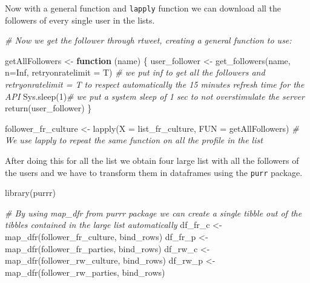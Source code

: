 \documentclass[
]{article}
\newenvironment{Shaded}{\begin{snugshade}}{\end{snugshade}}
\newcommand{\AttributeTok}[1]{\textcolor[rgb]{0.77,0.63,0.00}{#1}}
\newcommand{\CommentTok}[1]{\textcolor[rgb]{0.56,0.35,0.01}{\textit{#1}}}
\newcommand{\ConstantTok}[1]{\textcolor[rgb]{0.00,0.00,0.00}{#1}}
\newcommand{\ControlFlowTok}[1]{\textcolor[rgb]{0.13,0.29,0.53}{\textbf{#1}}}
\newcommand{\DecValTok}[1]{\textcolor[rgb]{0.00,0.00,0.81}{#1}}
\newcommand{\FunctionTok}[1]{\textcolor[rgb]{0.00,0.00,0.00}{#1}}
\newcommand{\NormalTok}[1]{#1}
\newcommand{\OtherTok}[1]{\textcolor[rgb]{0.56,0.35,0.01}{#1}}
\begin{document}
Now with a general function and \texttt{lapply} function we can download
all the followers of every single user in the lists.

\begin{Shaded}
\begin{Highlighting}[]
\CommentTok{\# Now we get the follower through rtweet, creating a general function to use:}

\NormalTok{getAllFollowers }\OtherTok{\textless{}{-}} \ControlFlowTok{function}\NormalTok{ (name) \{ }
\NormalTok{    user\_follower }\OtherTok{\textless{}{-}} \FunctionTok{get\_followers}\NormalTok{(name, }\AttributeTok{n=}\ConstantTok{Inf}\NormalTok{, }\AttributeTok{retryonratelimit =}\NormalTok{ T) }
  \CommentTok{\# we put inf to get all the followers and retryonratelimit = T to respect automatically the 15 minutes refresh time for the API}
    \FunctionTok{Sys.sleep}\NormalTok{(}\DecValTok{1}\NormalTok{)}\CommentTok{\# we put a system sleep of 1 sec to not overstimulate the server}
    \FunctionTok{return}\NormalTok{(user\_follower) \}}

\NormalTok{follower\_fr\_culture }\OtherTok{\textless{}{-}} \FunctionTok{lapply}\NormalTok{(}\AttributeTok{X =}\NormalTok{ list\_fr\_culture, }\AttributeTok{FUN =}\NormalTok{ getAllFollowers) }
\CommentTok{\# We use lapply to repeat the same function on all the profile in the list}
\end{Highlighting}
\end{Shaded}

After doing this for all the list we obtain four large list with all the
followers of the users and we have to transform them in dataframes using
the \texttt{purr} package.

\begin{Shaded}
\begin{Highlighting}[]
\FunctionTok{library}\NormalTok{(purrr)}

\CommentTok{\# By using map\_dfr from purrr package we can create a single tibble out of the tibbles contained in the large list automatically}
\NormalTok{df\_fr\_c }\OtherTok{\textless{}{-}} \FunctionTok{map\_dfr}\NormalTok{(follower\_fr\_culture, bind\_rows)}
\NormalTok{df\_fr\_p }\OtherTok{\textless{}{-}} \FunctionTok{map\_dfr}\NormalTok{(follower\_fr\_parties, bind\_rows)}
\NormalTok{df\_rw\_c }\OtherTok{\textless{}{-}} \FunctionTok{map\_dfr}\NormalTok{(follower\_rw\_culture, bind\_rows)}
\NormalTok{df\_rw\_p }\OtherTok{\textless{}{-}} \FunctionTok{map\_dfr}\NormalTok{(follower\_rw\_parties, bind\_rows)}
\end{Highlighting}
\end{Shaded}
\end{document}
